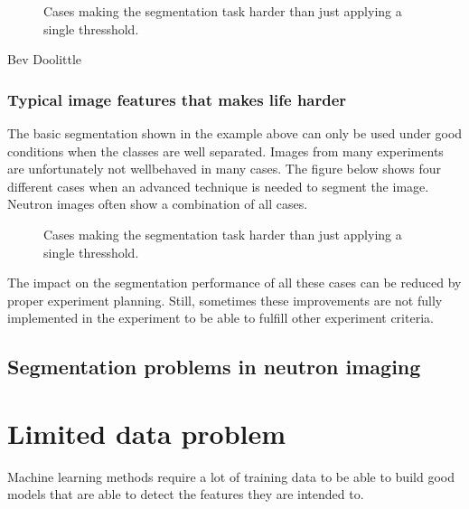 \documentclass[letterpaper,10pt,english]{sphinxmanual}
\begin{document}
\begin{figure}[htbp]
\centering
\capstart

\noindent{}
\caption{Cases making the segmentation task harder than just applying a single thresshold.}\label{\detokenize{ML4NeutronImageSegmentation:id9}}\end{figure}



 Bev Doolittle


\subsection{Typical image features that makes life harder}
\label{\detokenize{ML4NeutronImageSegmentation:typical-image-features-that-makes-life-harder}}
The basic segmentation shown in the example above can only be used under good conditions when the classes are well separated. Images from many experiments are unfortunately not well\sphinxhyphen{}behaved in many cases. The figure below shows four different cases when an advanced technique is needed to segment the image. Neutron images often show a combination of all cases.

\begin{figure}[htbp]
\centering
\capstart

\noindent{}
\caption{Cases making the segmentation task harder than just applying a single thresshold.}\label{\detokenize{ML4NeutronImageSegmentation:id10}}\end{figure}

The impact on the segmentation performance of all these cases can be reduced by proper experiment planning. Still, sometimes these improvements are not fully implemented in the experiment to be able to fulfill other experiment criteria.




\section{Segmentation problems in neutron imaging}
\label{\detokenize{ML4NeutronImageSegmentation:segmentation-problems-in-neutron-imaging}}

\chapter{Limited data problem}
\label{\detokenize{ML4NeutronImageSegmentation:limited-data-problem}}
Machine learning methods require a lot of training data to be able to build good models that are able to detect the features they are intended to.
\end{document}
